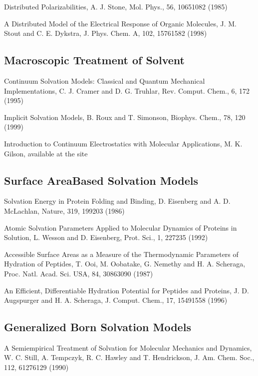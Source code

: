 \documentclass[letterpaper,11pt,english]{sphinxmanual}
\begin{document}
Distributed Polarizabilities, A. J. Stone, Mol. Phys., 56, 1065\sphinxhyphen{}1082 (1985)

A Distributed Model of the Electrical Response of Organic Molecules, J. M. Stout and C. E. Dykstra, J. Phys. Chem. A, 102, 1576\sphinxhyphen{}1582 (1998)


\subsection{Macroscopic Treatment of Solvent}
\label{\detokenize{text/references:macroscopic-treatment-of-solvent}}
Continuum Solvation Models: Classical and Quantum Mechanical Implementations, C. J. Cramer and D. G. Truhlar, Rev. Comput. Chem., 6, 1\sphinxhyphen{}72 (1995)

Implicit Solvation Models, B. Roux and T. Simonson, Biophys. Chem., 78, 1\sphinxhyphen{}20 (1999)

Introduction to Continuum Electrostatics with Molecular Applications, M. K. Gilson, available at the site 


\subsection{Surface Area\sphinxhyphen{}Based Solvation Models}
\label{\detokenize{text/references:surface-area-based-solvation-models}}
Solvation Energy in Protein Folding and Binding, D. Eisenberg and A. D. McLachlan, Nature, 319, 199\sphinxhyphen{}203 (1986)

Atomic Solvation Parameters Applied to Molecular Dynamics of Proteins in Solution, L. Wesson and D. Eisenberg, Prot. Sci., 1, 227\sphinxhyphen{}235 (1992)

Accessible Surface Areas as a Measure of the Thermodynamic Parameters of Hydration of Peptides, T. Ooi, M. Oobatake, G. Nemethy and H. A. Scheraga, Proc. Natl. Acad. Sci. USA, 84, 3086\sphinxhyphen{}3090 (1987)

An Efficient, Differentiable Hydration Potential for Peptides and Proteins, J. D. Augspurger and H. A. Scheraga, J. Comput. Chem., 17, 1549\sphinxhyphen{}1558 (1996)


\subsection{Generalized Born Solvation Models}
\label{\detokenize{text/references:generalized-born-solvation-models}}
A Semiempirical Treatment of Solvation for Molecular Mechanics and Dynamics, W. C. Still, A. Tempczyk, R. C. Hawley and T. Hendrickson, J. Am. Chem. Soc., 112, 6127\sphinxhyphen{}6129 (1990)
\end{document}
